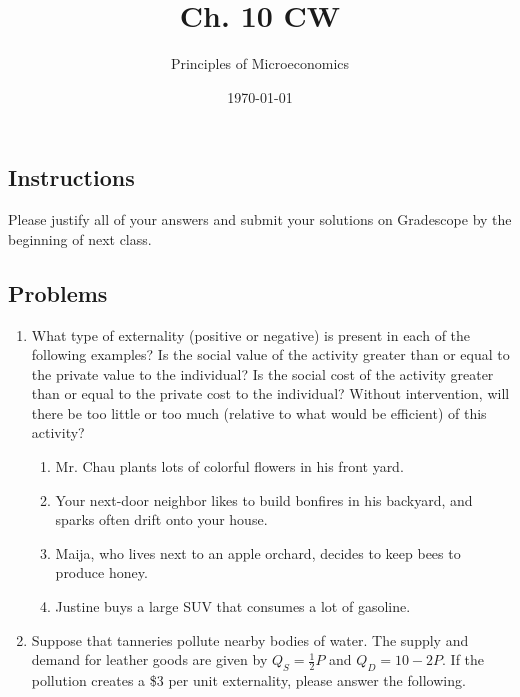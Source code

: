\documentclass{article}
\title{Ch. 10 CW}
\author{Principles of Microeconomics}
\date{\today}
\begin{document}
\maketitle

\subsection*{Instructions} Please justify all of your answers and submit your solutions on Gradescope by the beginning of next class. 


\subsection*{Problems}

\begin{enumerate}

\item What type of externality (positive or negative) is present in each of the following examples? Is the social value of the activity greater than or equal to the private value to the individual? Is the social cost of the activity greater than or equal to the private cost to the individual? Without intervention, will there be too little or too much (relative to what would be efficient) of this activity?

	\begin{enumerate}
	
	\item Mr. Chau plants lots of colorful flowers in his front yard.
	
	\item Your next-door neighbor likes to build bonfires in his backyard, and sparks often drift onto your house.
	
	\item Maija, who lives next to an apple orchard, decides to keep bees to produce honey.
	
	\item Justine buys a large SUV that consumes a lot of gasoline.
	
	\end{enumerate}

\item Suppose that tanneries pollute nearby bodies of water. The supply and demand for leather goods are given by $Q_S = \frac{1}{2}P$ and $Q_D = 10 - 2P$. If the pollution creates a \$3 per unit externality, please answer the following.

	\begin{enumerate}
	

\end{enumerate}
\end{enumerate}
\end{document}
